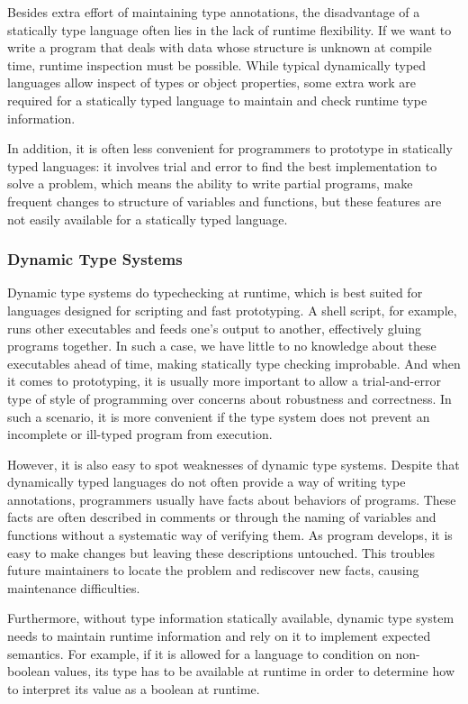 Besides extra effort of maintaining type annotations,
the disadvantage of a statically type language often lies in the lack of runtime flexibility.
If we want to write a program that deals with data whose structure is
unknown at compile time, runtime inspection must be possible.
While typical dynamically typed languages allow inspect of types or object properties,
some extra work are required for a statically typed language
to maintain and check runtime type information.

In addition, it is often less convenient for programmers to prototype
in statically typed languages: it involves trial and error to find the best implementation
to solve a problem, which means the ability to write partial programs,
make frequent changes to structure of variables and functions, but these features are not easily available for a statically typed language.

\subsubsection{Dynamic Type Systems}

Dynamic type systems do typechecking at runtime, which is best suited for
languages designed for scripting and fast prototyping.
A shell script, for example, runs other executables and feeds one's output to another,
effectively gluing programs together.
In such a case, we have little to no knowledge about these executables ahead of time,
making statically type checking improbable.
And when it comes to prototyping,
it is usually more important to allow a trial-and-error type of style of programming
over concerns about robustness and correctness.
In such a scenario, it is more convenient if the type system does not prevent
an incomplete or ill-typed program from execution.

However, it is also easy to spot weaknesses of dynamic type systems.
Despite that dynamically typed languages do not often provide a way of writing type annotations,
programmers usually have facts about behaviors of programs.
These facts are often described in comments or through the naming of variables and functions without a systematic way of verifying them.
As program develops, it is easy to make changes but leaving these descriptions untouched.
This troubles future maintainers to locate the problem and rediscover new facts,
causing maintenance difficulties.

Furthermore, without type information statically available,
dynamic type system needs to maintain runtime information
and rely on it to implement expected semantics.
For example, if it is allowed for a language to condition on non-boolean values,
its type has to be available at runtime in order to
determine how to interpret its value as a boolean at runtime.

